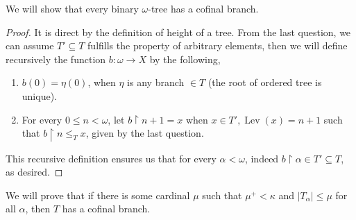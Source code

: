\question{}
We will show that every binary $\omega$-tree has a cofinal branch.
\begin{proof}
	It is direct by the definition of height of a tree.
	From the last question, we can assume $T' \subseteq T$ fulfills the property of arbitrary elements, then we will define recursively the function $b : \omega \to X$ by the following,
	\begin{enumerate}
		\item $b(0) = \eta(0)$, when $\eta$ is any branch $\in T$ (the root of ordered tree is unique).
		\item For every $0 \le n < \omega$, let $b \restriction n + 1 = x$ when $x \in T', \operatorname{Lev}(x) = n + 1$ such that $b \restriction n \le_T x$, given by the last question.
	\end{enumerate}
	This recursive definition ensures us that for every $\alpha < \omega$, indeed $b \restriction \alpha \in T' \subseteq T$, as desired.
\end{proof}

\question{}
We will prove that if there is some cardinal $\mu$ such that $\mu^+ < \kappa$ and $|T_\alpha| \le \mu$ for all $\alpha$, then $T$ has a cofinal branch.



